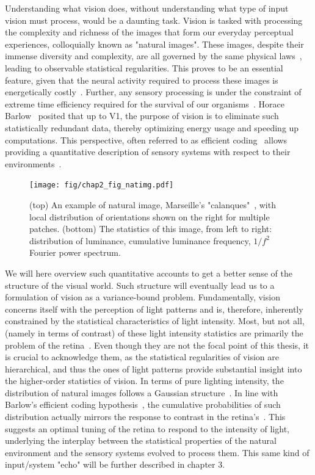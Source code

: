 Understanding what vision does, without understanding what type of input vision must process, would be a daunting task. Vision is tasked with processing the complexity and richness of the images that form our everyday perceptual experiences, colloquially known as "natural images". These images, despite their immense diversity and complexity, are all governed by the same physical laws~\cite{stevens1974patterns}, leading to observable statistical regularities. This proves to be an essential feature, given that the neural activity required to process these images is energetically costly~\cite{laughlin1998metabolic}. Further, any sensory processing is under the constraint of extreme time efficiency required for the survival of our organisms~\cite{thorpe1996speed, kirchner2006ultra}.
Horace Barlow~\cite{barlow1961possible} posited that up to \gls{V1}, the purpose of vision is to eliminate such statistically redundant data, thereby optimizing energy usage and speeding up computations. This perspective, often referred to as efficient coding~\cite{olshausen1996natural} allows providing a quantitative description of sensory systems with respect to their environments~\cite{simoncelli2001natural}.

\begin{figure}[h!tbp]
\vspace{0.25cm}
\centering
\texttt{[image: fig/chap2\_fig\_natimg.pdf]}
\caption[An example of natural image statistics.]{(top) An example of natural image, Marseille's "calanques"~\cite{ladret2023cortical}, with local distribution of orientations shown on the right for multiple patches. (bottom) The statistics of this image, from left to right: distribution of luminance, cumulative luminance frequency, $1/f^2$ Fourier power spectrum.}
\label{fig_chap2_stats_natimg}
\end{figure}

We will here overview such quantitative accounts to get a better sense of the structure of the visual world. Such structure will eventually lead us to a formulation of vision as a variance-bound problem. Fundamentally, vision concerns itself with the perception of light patterns and is, therefore, inherently constrained by the statistical characteristics of light intensity. Most, but not all, (namely in terms of contrast) of these light intensity statistics are primarily the problem of the retina~\cite{barlow1956retinal}. Even though they are not the focal point of this thesis, it is crucial to acknowledge them, as the statistical regularities of vision are hierarchical, and thus the ones of light patterns provide substantial insight into the higher-order statistics of vision. In terms of pure lighting intensity, the distribution of natural images follows a Gaussian structure~\cite{laughlin1981simple}. In line with Barlow's efficient coding hypothesis~\cite{barlow1961possible}, the cumulative probabilities of such distribution actually mirrors the response to contrast in the retina's~\cite{naka1966s, laughlin1981simple}. This suggests an optimal tuning of the retina to respond to the intensity of light, underlying the interplay between the statistical properties of the natural environment and the sensory systems evolved to process them. This same kind of input/system "echo" will be further described in chapter 3.

